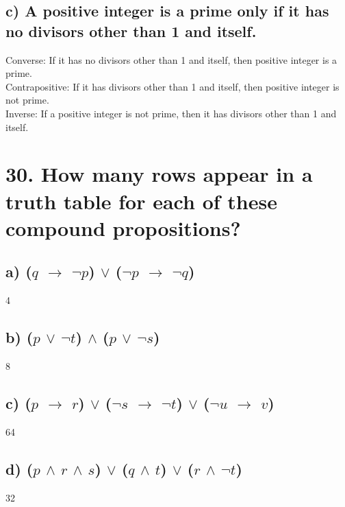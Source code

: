 \documentclass[11pt, oneside]{article} %
\numberwithin{equation}{section} %
\numberwithin{figure}{section} %
\numberwithin{table}{section} %
\begin{document}
\subsection{c) A positive integer is a prime only if it has no divisors
other than 1 and itself.}
Converse: If it has no divisors other than 1 and itself, then positive integer is a prime.\\
Contrapositive: If it has divisors other than 1 and itself, then positive integer is not prime.\\
Inverse: If a positive integer is not prime, then it has divisors other than 1 and itself.


\section{30. How many rows appear in a truth table for each of these
compound propositions?}
\subsection{a) ($q$ $\rightarrow$ $\neg$$p$) $\vee$ ($\neg$$p$ $\rightarrow$ $\neg$$q$)}
4
\subsection{b) ($p$ $\vee$ $\neg$$t$) $\wedge$ ($p$ $\vee$ $\neg$$s$)}
8
\subsection{c) ($p$ $\rightarrow$ $r$) $\vee$ ($\neg$$s$ $\rightarrow$ $\neg$$t$) $\vee$ ($\neg$$u$ $\rightarrow$ $v$)}
64
\subsection{d) ($p$ $\wedge$ $r$ $\wedge$ $s$) $\vee$ ($q$ $\wedge$ $t$) $\vee$ ($r$ $\wedge$ $\neg$$t$)}
32

\end{document}
